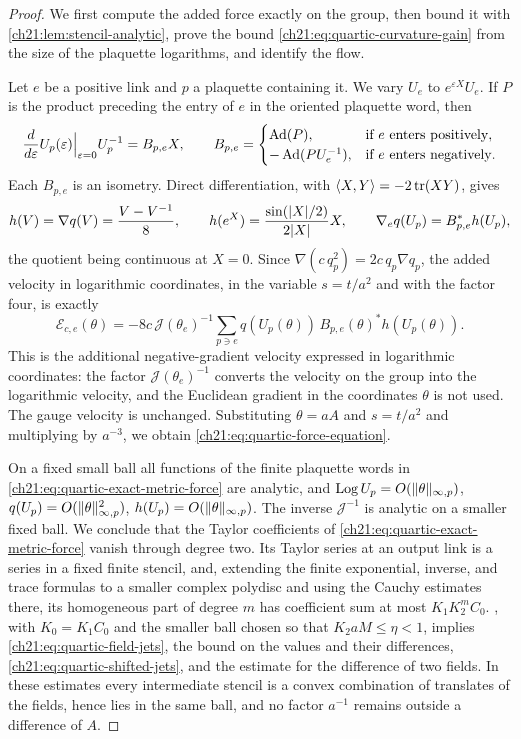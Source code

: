 \begin{proof}
We first compute the added force exactly on the group, then bound it with \cref{ch21:lem:stencil-analytic}, prove the bound \eqref{ch21:eq:quartic-curvature-gain} from the size of the plaquette logarithms, and identify the flow.

Let $e$ be a positive link and $p$ a plaquette containing it. We vary $U_e$ to $e^{\varepsilon X}U_e$. If $P$ is the product preceding the entry of $e$ in the oriented plaquette word, then
\[
 \frac{d}{d\varepsilon}U_p(\varepsilon)\Big|_{\varepsilon=0}U_p^{-1}=B_{p,e}X,\qquad
 B_{p,e}=\begin{cases}\operatorname{Ad}(P),&\text{if $e$ enters positively},\\ -\operatorname{Ad}(PU_e^{-1}),&\text{if $e$ enters negatively}.\end{cases}
\]
Each $B_{p,e}$ is an isometry. Direct differentiation, with $\langle X,Y\rangle=-2\operatorname{tr}(XY)$, gives
\[
 h(V)=\nabla q(V)=\frac{V-V^{-1}}8,\qquad h(e^X)=\frac{\sin(\lvert X\rvert/2)}{2\lvert X\rvert}X,\qquad\nabla_eq(U_p)=B_{p,e}^*h(U_p),
\]
the quotient being continuous at $X=0$. Since $\nabla(c\,q_p^2)=2c\,q_p\nabla q_p$, the added velocity in logarithmic coordinates, in the variable $s=t/a^2$ and with the factor four, is exactly
\begin{equation}\label{ch21:eq:quartic-exact-metric-force}
 \mathscr E_{c,e}(\theta)=-8c\,\mathcal J(\theta_e)^{-1}\sum_{p\ni e}q(U_p(\theta))\,B_{p,e}(\theta)^*h(U_p(\theta)).
\end{equation}
This is the additional negative-gradient velocity expressed in logarithmic coordinates: the factor $\mathcal J(\theta_e)^{-1}$ converts the velocity on the group into the logarithmic velocity, and the Euclidean gradient in the coordinates $\theta$ is not used. The gauge velocity is unchanged. Substituting $\theta=aA$ and $s=t/a^2$ and multiplying by $a^{-3}$, we obtain \eqref{ch21:eq:quartic-force-equation}.

On a fixed small ball all functions of the finite plaquette words in \eqref{ch21:eq:quartic-exact-metric-force} are analytic, and $\operatorname{Log} U_p=O(\lVert \theta\rVert_{\infty,p})$, $q(U_p)=O(\lVert \theta\rVert_{\infty,p}^2)$, $h(U_p)=O(\lVert \theta\rVert_{\infty,p})$. The inverse $\mathcal J^{-1}$ is analytic on a smaller fixed ball. We conclude that the Taylor coefficients of \eqref{ch21:eq:quartic-exact-metric-force} vanish through degree two. Its Taylor series at an output link is a series in a fixed finite stencil, and, extending the finite exponential, inverse, and trace formulas to a smaller complex polydisc and using the Cauchy estimates there, its homogeneous part of degree $m$ has coefficient sum at most $K_1K_2^mC_0$. , with $K_0=K_1C_0$ and the smaller ball chosen so that $K_2aM\le\eta<1$, implies \eqref{ch21:eq:quartic-field-jets}, the bound on the values and their differences, \eqref{ch21:eq:quartic-shifted-jets}, and the estimate for the difference of two fields. In these estimates every intermediate stencil is a convex combination of translates of the fields, hence lies in the same ball, and no factor $a^{-1}$ remains outside a difference of $A$.


\end{proof}
